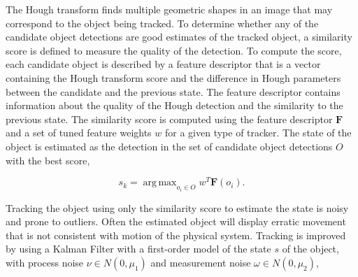 \documentclass[letterpaper, 10 pt, conference]{ieeeconf}
\DeclareMathOperator*{\argmax}{arg\,max}
\begin{document}

The Hough transform finds multiple geometric shapes in an image that may correspond to the object being tracked. To determine whether any of the candidate object detections are good estimates of the tracked object, a similarity score is defined to measure the quality of the detection. To compute the score, each candidate object is described by a feature descriptor that is a vector containing the Hough transform score and the difference in Hough parameters between the candidate and the previous state. The feature descriptor contains information about the quality of the Hough detection and the similarity to the previous state. The similarity score is computed using the feature descriptor $\textbf{F}$ and a set of tuned feature weights $w$ for a given type of tracker. The state of the object is estimated as the detection in the set of candidate object detections $O$ with the best score,


\begin{equation} \label{eq:similarity_score}
	s_{k} = \argmax_{o_i \in O} w^T \textbf{F}(o_i).
\end{equation}

Tracking the object using only the similarity score to estimate the state is noisy and prone to outliers. Often the estimated object will display erratic movement that is not consistent with motion of the physical system. Tracking is improved by using a Kalman Filter with a first-order model of the state $s$ of the object, with process noise $\nu \in N(0, \mu_1)$ and measurement noise $\omega \in N(0, \mu_2)$,
\end{document}
